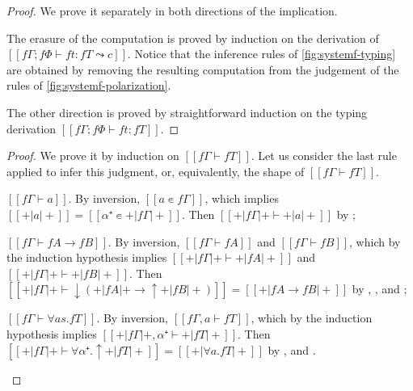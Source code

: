\lemmaPolRemovable*
\begin{proof}
  We prove it separately in both directions of the implication. 

  The erasure of the computation is proved by
   induction on the derivation of $[[fΓ ; fΦ ⊢ ft : fT ⤳ c]]$.
  Notice that the inference rules of \cref{fig:systemf-typing}
  are obtained by removing the resulting computation from the judgement of the 
  rules of \cref{fig:systemf-polarization}.

  The other direction is proved by straightforward 
  induction on the typing derivation $[[fΓ ; fΦ ⊢ ft : fT]]$.
\end{proof}

\lemmaTypPolWf*
\begin{proof}
  We prove it by induction on $[[fΓ ⊢ fT]]$.
  Let us consider the last rule applied to infer this judgment,
  or, equivalently, the shape of $[[fΓ ⊢ fT]]$.
  \begin{caseof}
    \item $[[fΓ ⊢ a]]$.
      By inversion, $[[a ∊ fΓ]]$, 
      which implies $[[+|a|+]] = [[α⁺ ∊ +|fΓ|+]]$.
      Then $[[+|fΓ|+ ⊢ +|a|+ ]]$
      by ;
    \item $[[fΓ ⊢ fA → fB]]$.
      By inversion,  $[[fΓ ⊢ fA]]$ and $[[fΓ ⊢ fB]]$,
      which by the induction hypothesis implies $[[+|fΓ|+ ⊢ +|fA|+]]$ and $[[+|fΓ|+ ⊢ +|fB|+]]$.
      Then $[[+|fΓ|+ ⊢ ↓(+|fA|+ → ↑+|fB|+)]] = [[+|fA → fB|+]]$ by 
      ,
      , and
      ;
    \item $[[fΓ ⊢ ∀as.fT]]$.
      By inversion, $[[fΓ, a ⊢ fT]]$,
      which by the induction hypothesis implies $[[+|fΓ|+, α⁺ ⊢ +|fT|+]]$.
      Then $[[+|fΓ|+ ⊢ ∀α⁺.↑+|fT|+]] = [[+|∀a.fT|+]]$ by 
      , and .
  \end{caseof}
\end{proof}

